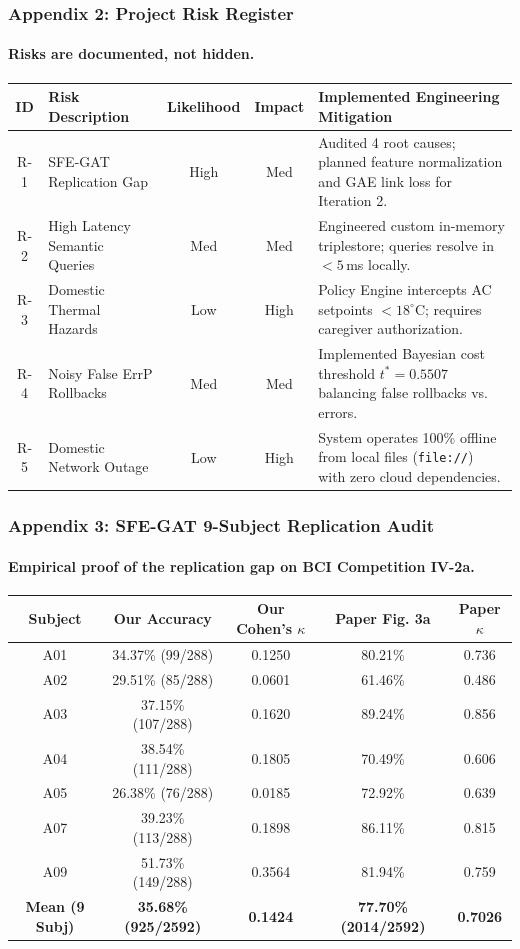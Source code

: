 \documentclass[aspectratio=169,10pt]{beamer}
\begin{document}
\begin{frame}
    \frametitle{Appendix 2: Project Risk Register}
    \framesubtitle{Risks are documented, not hidden.}
    \scriptsize
    \begin{tabularx}{\textwidth}{c p{3.5cm} c c X}
        \toprule
        \textbf{ID} & \textbf{Risk Description} & \textbf{Likelihood} & \textbf{Impact} & \textbf{Implemented Engineering Mitigation} \\
        \midrule
        R-1 & SFE-GAT Replication Gap & High & Med & Audited 4 root causes; planned feature normalization and GAE link loss for Iteration 2. \\
        R-2 & High Latency Semantic Queries & Med & Med & Engineered custom in-memory triplestore; queries resolve in $< 5$\,ms locally. \\
        R-3 & Domestic Thermal Hazards & Low & High & Policy Engine intercepts AC setpoints $< 18^\circ$C; requires caregiver authorization. \\
        R-4 & Noisy False ErrP Rollbacks & Med & Med & Implemented Bayesian cost threshold $t^* = 0.5507$ balancing false rollbacks vs. errors. \\
        R-5 & Domestic Network Outage & Low & High & System operates 100\% offline from local files (\texttt{file://}) with zero cloud dependencies. \\
        \bottomrule
    \end{tabularx}
\end{frame}

\begin{frame}
    \frametitle{Appendix 3: SFE-GAT 9-Subject Replication Audit}
    \framesubtitle{Empirical proof of the replication gap on BCI Competition IV-2a.}
    \scriptsize
    \centering
    \begin{tabularx}{0.85\textwidth}{c c c c c}
        \toprule
        \textbf{Subject} & \textbf{Our Accuracy} & \textbf{Our Cohen's $\kappa$} & \textbf{Paper Fig. 3a} & \textbf{Paper $\kappa$} \\
        \midrule
        A01 & 34.37\% (99/288) & 0.1250 & 80.21\% & 0.736 \\
        A02 & 29.51\% (85/288) & 0.0601 & 61.46\% & 0.486 \\
        A03 & 37.15\% (107/288) & 0.1620 & 89.24\% & 0.856 \\
        A04 & 38.54\% (111/288) & 0.1805 & 70.49\% & 0.606 \\
        A05 & 26.38\% (76/288) & 0.0185 & 72.92\% & 0.639 \\
        A07 & 39.23\% (113/288) & 0.1898 & 86.11\% & 0.815 \\
        A09 & 51.73\% (149/288) & 0.3564 & 81.94\% & 0.759 \\
        \midrule
        \textbf{Mean (9 Subj)} & \textbf{35.68\% (925/2592)} & \textbf{0.1424} & \textbf{77.70\% (2014/2592)} & \textbf{0.7026} \\
        \bottomrule
    \end{tabularx}
\end{frame}
\end{document}
